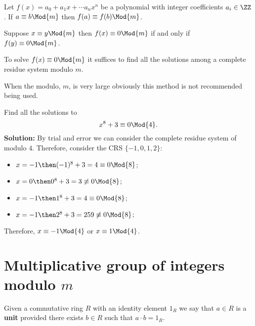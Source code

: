 \documentclass[12pt, a4paper]{article}
\begin{document}
\begin{mdlemma}
    Let \(f(x)= a_0 +a_1 x+\cdots a_nx^n\) be a polynomial with integer coefficients \(a_i \in \ZZ\). If \(a \equiv b \Mod{m}\) then \(f(a) \equiv f(b)\Mod{m}\).
\end{mdlemma}

\begin{corollary}
    Suppose \(x\equiv y \Mod{m}\) then \(f(x) \equiv 0 \Mod{m}\) if and only if \\\(f(y) \equiv 0 \Mod{m}\). 
\end{corollary}

\begin{mdremark}
    To solve \(f(x)\equiv 0 \Mod{m}\) it suffices to find all the solutions among a complete residue system modulo \(m\).
\end{mdremark}

\begin{mdnote}
    When the modulo, \(m\), is very large obviously this method is not recommended being used.
\end{mdnote}

\begin{mdexample}
    Find all the solutions to 
    \[x^8 +3 \equiv 0 \Mod{4}.\]
    \textbf{Solution:} By trial and error we can consider the complete residue system of modulo \(4\). Therefore, consider the CRS \(\{-1,0,1,2\}\):
    \begin{itemize}
        \item \(x=-1 \then (-1)^8+3 = 4 \equiv 0 \Mod{8}\);
        \item \(x=0 \then 0^8+3 = 3 \not\equiv 0 \Mod{8}\);
        \item \(x=-1 \then 1^8+3 = 4 \equiv 0 \Mod{8}\);
        \item \(x=-1 \then 2^8+3 = 259 \not\equiv 0 \Mod{8}\);
    \end{itemize}
    Therefore, \(x \equiv -1 \Mod{4}\) or \(x \equiv 1 \Mod{4}\).
\end{mdexample}

\section{Multiplicative group of integers modulo \texorpdfstring{\(m\)}{TEXT}}

\begin{definition}
    Given a commutative ring \(R\) with an identity element \(1_R\) we say that \(a\in R\) is a \textbf{unit} provided there exists \(b\in R\) such that \(a\cdot b =1_R\).
\end{definition}
\end{document}
